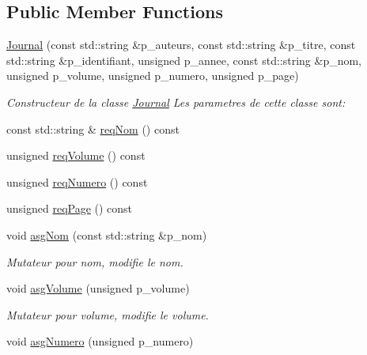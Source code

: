 \subsection*{Public Member Functions}
\begin{DoxyCompactItemize}
\item 
\hyperlink{classtp_1_1Journal_a29ba681f3e9c3c755f0903de6163b04a}{Journal} (const std\+::string \&p\+\_\+auteurs, const std\+::string \&p\+\_\+titre, const std\+::string \&p\+\_\+identifiant, unsigned p\+\_\+annee, const std\+::string \&p\+\_\+nom, unsigned p\+\_\+volume, unsigned p\+\_\+numero, unsigned p\+\_\+page)
\begin{DoxyCompactList}\small\item\em Constructeur de la classe \hyperlink{classtp_1_1Journal}{Journal} Les parametres de cette classe sont\+: \end{DoxyCompactList}\item 
const std\+::string \& \hyperlink{classtp_1_1Journal_a86f42ccad53aba8a6751e22f93e31e0b}{req\+Nom} () const 
\item 
unsigned \hyperlink{classtp_1_1Journal_aded8daafc9b7825d25c66191b14ac837}{req\+Volume} () const 
\item 
unsigned \hyperlink{classtp_1_1Journal_ac4a5da3c7d51cac23f661ff57daa49aa}{req\+Numero} () const 
\item 
unsigned \hyperlink{classtp_1_1Journal_a769fa7159eacd6afffd2ce704a38c370}{req\+Page} () const 
\item 
\hypertarget{classtp_1_1Journal_a4a2c3775789f5db43e4fc7312ef9624a}{}void \hyperlink{classtp_1_1Journal_a4a2c3775789f5db43e4fc7312ef9624a}{asg\+Nom} (const std\+::string \&p\+\_\+nom)\label{classtp_1_1Journal_a4a2c3775789f5db43e4fc7312ef9624a}

\begin{DoxyCompactList}\small\item\em Mutateur pour nom, modifie le nom. \end{DoxyCompactList}\item 
\hypertarget{classtp_1_1Journal_a9aa261a1fc5aa170127042e88e281115}{}void \hyperlink{classtp_1_1Journal_a9aa261a1fc5aa170127042e88e281115}{asg\+Volume} (unsigned p\+\_\+volume)\label{classtp_1_1Journal_a9aa261a1fc5aa170127042e88e281115}

\begin{DoxyCompactList}\small\item\em Mutateur pour volume, modifie le volume. \end{DoxyCompactList}\item 
\hypertarget{classtp_1_1Journal_aa1a08e16b6eb8482e5f2dc40af471b24}{}void \hyperlink{classtp_1_1Journal_aa1a08e16b6eb8482e5f2dc40af471b24}{asg\+Numero} (unsigned p\+\_\+numero)\label{classtp_1_1Journal_aa1a08e16b6eb8482e5f2dc40af471b24}


\end{DoxyCompactItemize}
